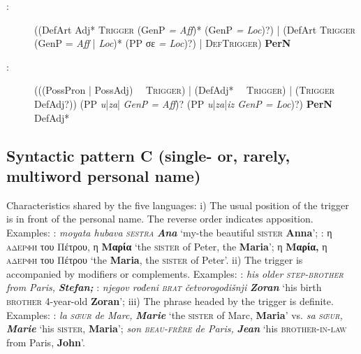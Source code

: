 \documentclass[output=paper]{langsci/langscibook}
\newcommand{\trigger}[1]{\textsc{#1}}
\begin{document}
\begin{description}
 

\item[:] ((DefArt Adj* \trigger{Trigger} (GenP \textit{= Aff})* (GenP\textit{ =
Loc})?) | (DefArt \trigger{Trigger} (GenP = \textit{Aff} | \textit{Loc})* (PP
σε \textit{= Loc})?) | \trigger{DefTrigger}) \textbf{PerN}

 

\item[:] (((PossPron | PossAdj) ~~\trigger{Trigger}) | (DefAdj* ~~\trigger{Trigger})
| (\trigger{Trigger} DefAdj?)) (PP \textit{u}|\textit{za}| \textit{GenP = Aff})? (PP
\textit{u}|\textit{za}|\textit{iz GenP = Loc})?) \textbf{PerN} DefAdj*
\end{description}


\clearpage 

\subsection{Syntactic pattern C (single- or, rarely, multiword personal name)}

Characteristics shared by the five languages: i) The usual position of
the trigger is in front of the personal name. The reverse order
indicates apposition. Examples: : \textit{moyata hubava
}\textit{\trigger{sestra}} \textbf{\textit{Ana}} ‘my-the beautiful
\trigger{sister} \textbf{Anna}’; : η \trigger{αδερφή}
του Πέτρου, η \textbf{Μαρία} ‘the \trigger{sister} of
Peter, the \textbf{Maria}’; η \textbf{Μαρία,}
η \trigger{αδερφή} του Πέτρου ‘the
\textbf{Maria}, the \trigger{sister} of Peter’. ii) The trigger is
accompanied by modifiers or complements. Examples: : \textit{his
older }\textit{\trigger{step-brother}} \textit{from Paris,}
\textbf{\textit{Stefan; }}: \textit{njegov rođeni
}\textit{\trigger{brat}} \textit{četvorogodišnji} \textbf{\textit{Zoran
}}‘his birth \trigger{brother} 4-year-old \textbf{Zoran}’; iii) The
phrase headed by the trigger is definite. Examples: : \textit{la
}\textit{\trigger{sœur}} \textit{de Marc,} \textbf{\textit{Marie}} ‘the
\trigger{sister} of Marc, \textbf{Maria}’ vs. \textit{sa
}\textit{\trigger{sœur}}\textit{,} \textbf{\textit{Marie}} ‘his
\trigger{sister}, \textbf{Maria}’; \textit{son}\trigger{
}\textit{\trigger{beau-frère}} \textit{de Paris,} \textbf{\textit{Jean}}
‘his \trigger{brother-in-law} from Paris, \textbf{John}’.
\end{document}
